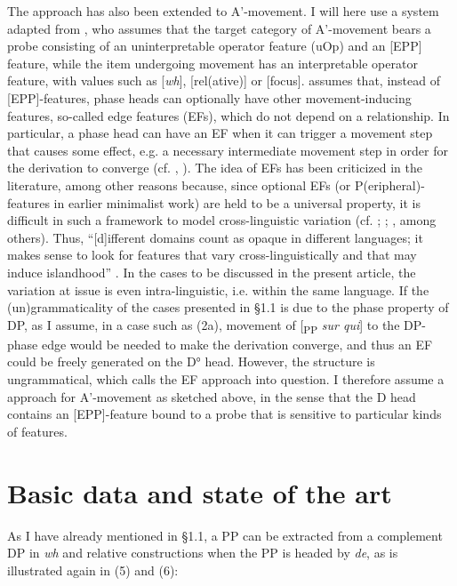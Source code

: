 \documentclass[output=paper]{langsci/langscibook}
\begin{document}
The  approach has also been extended to A’-movement. I will here use a system adapted from \citet[419ff.]{Radford2004}, who assumes that the target category of A’-movement bears a probe consisting of an uninterpretable operator feature (uOp) and an [EPP] feature, while the item undergoing movement has an interpretable operator feature, with values such as [\textit{wh}], [rel(ative)] or [focus]. \citet{Chomsky2007,Chomsky2008} assumes that, instead of [EPP]-features, phase heads can optionally have other movement-inducing features, so-called edge features (EFs), which do not depend on a  relationship. In particular, a phase head can have an EF when it can trigger a movement step that causes some effect, e.g. a necessary intermediate movement step in order for the derivation to converge (cf. \citealt[149]{Chomsky2008}, \citealt{Mueller2010deriving}). The idea of EFs has been criticized in the literature, among other reasons because, since optional EFs (or P(eripheral)-features in earlier minimalist work) are held to be a universal property, it is difficult in such a framework to model cross-linguistic variation (cf. \citealt{Ceplova2001}; \citealt{Boeckx2007}; \citealt{Boeckx2011}, among others). Thus, “[d]ifferent domains count as opaque in different languages; it makes sense to look for features that vary cross-linguistically and that may induce islandhood” \citep[4]{Boeckx2011}. In the cases to be discussed in the present article, the variation at issue is even intra-linguistic, i.e. within the same language. If the (un)grammaticality of the  cases presented in §1.1 is due to the phase property of DP, as I assume, in a case such as (2a), movement of [\textsubscript{PP} \textit{sur qui}] to the DP-phase edge would be needed to make the derivation converge, and thus an EF could be freely generated on the D° head. However, the structure is ungrammatical, which calls the EF approach into question. I therefore assume a  approach for A’-movement as sketched above, in the sense that the D head contains an [EPP]-feature bound to a probe that is sensitive to particular kinds of features.

\section{Basic data and state of the art}%

As I have already mentioned in §1.1, a PP can be extracted from a complement DP in \textit{wh} and relative constructions when the PP is headed by \textit{de}, as is illustrated again in (5) and (6):
\end{document}
